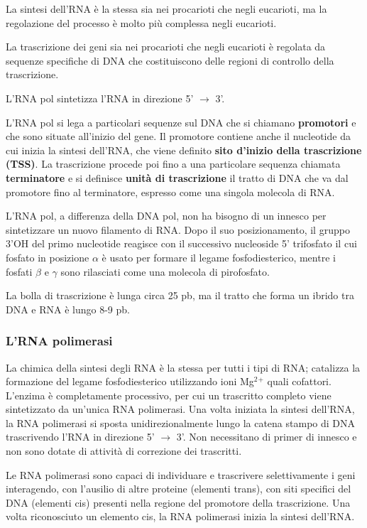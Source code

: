 \documentclass[]{article}
\begin{document}
La sintesi dell'RNA è la stessa sia nei procarioti che negli eucarioti,
ma la regolazione del processo è molto più complessa negli eucarioti.

La trascrizione dei geni sia nei procarioti che negli eucarioti è
regolata da sequenze specifiche di DNA che costituiscono delle regioni
di controllo della trascrizione.

L'RNA pol sintetizza l'RNA in direzione 5' \(\rightarrow\) 3'.

L'RNA pol si lega a particolari sequenze sul DNA che si chiamano
\textbf{promotori} e che sono situate all'inizio del gene. Il promotore
contiene anche il nucleotide da cui inizia la sintesi dell'RNA, che
viene definito \textbf{sito d'inizio della trascrizione (TSS)}. La
trascrizione procede poi fino a una particolare sequenza chiamata
\textbf{terminatore} e si definisce \textbf{unità di trascrizione} il
tratto di DNA che va dal promotore fino al terminatore, espresso come
una singola molecola di RNA.

L'RNA pol, a differenza della DNA pol, non ha bisogno di un innesco per
sintetizzare un nuovo filamento di RNA. Dopo il suo posizionamento, il
gruppo 3'OH del primo nucleotide reagisce con il successivo nucleoside
5' trifosfato il cui fosfato in posizione \(\alpha\) è usato per formare
il legame fosfodiesterico, mentre i fosfati \(\beta\) e \(\gamma\) sono
rilasciati come una molecola di pirofosfato.

La bolla di trascrizione è lunga circa 25 pb, ma il tratto che forma un
ibrido tra DNA e RNA è lungo 8-9 pb.

\subsubsection{L'RNA polimerasi}\label{lrna-polimerasi}

La chimica della sintesi degli RNA è la stessa per tutti i tipi di RNA;
catalizza la formazione del legame fosfodiesterico utilizzando ioni
Mg\(^2\)\(^+\) quali cofattori. L'enzima è completamente processivo, per
cui un trascritto completo viene sintetizzato da un'unica RNA
polimerasi. Una volta iniziata la sintesi dell'RNA, la RNA polimerasi si
sposta unidirezionalmente lungo la catena stampo di DNA trascrivendo
l'RNA in direzione 5' \(\rightarrow\) 3'. Non necessitano di primer di
innesco e non sono dotate di attività di correzione dei trascritti.

Le RNA polimerasi sono capaci di individuare e trascrivere
selettivamente i geni interagendo, con l'ausilio di altre proteine
(elementi trans), con siti specifici del DNA (elementi cis) presenti
nella regione del promotore della trascrizione. Una volta riconosciuto
un elemento cis, la RNA polimerasi inizia la sintesi dell'RNA.
\end{document}

